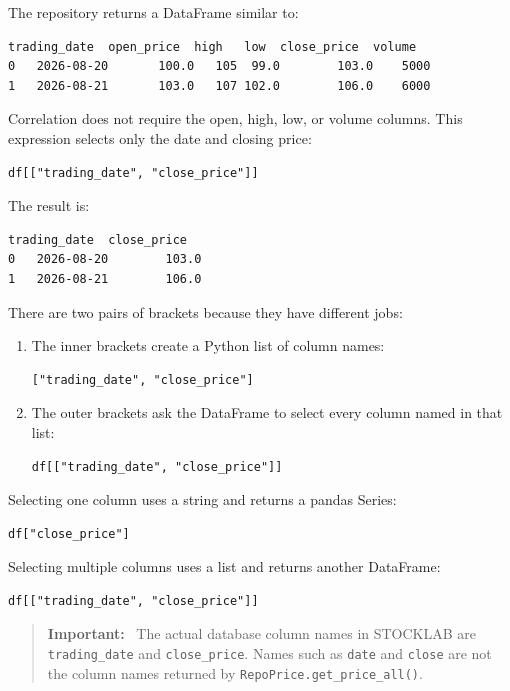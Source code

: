 \documentclass[11pt,a4paper]{article}
\newenvironment{important}
  {\begin{quote}\color{codered}\textbf{Important:}\ }
  {\end{quote}}
\begin{document}
The repository returns a DataFrame similar to:

\begin{lstlisting}[style=terminal]
  trading_date  open_price  high   low  close_price  volume
0   2026-08-20       100.0   105  99.0        103.0    5000
1   2026-08-21       103.0   107 102.0        106.0    6000
\end{lstlisting}

Correlation does not require the open, high, low, or volume columns. This
expression selects only the date and closing price:

\begin{lstlisting}[style=python]
df[["trading_date", "close_price"]]
\end{lstlisting}

The result is:

\begin{lstlisting}[style=terminal]
  trading_date  close_price
0   2026-08-20        103.0
1   2026-08-21        106.0
\end{lstlisting}

There are two pairs of brackets because they have different jobs:

\begin{enumerate}[leftmargin=2em]
    \item The inner brackets create a Python list of column names:
\begin{lstlisting}[style=python]
["trading_date", "close_price"]
\end{lstlisting}
    \item The outer brackets ask the DataFrame to select every column named in
    that list:
\begin{lstlisting}[style=python]
df[["trading_date", "close_price"]]
\end{lstlisting}
\end{enumerate}

Selecting one column uses a string and returns a pandas Series:

\begin{lstlisting}[style=python]
df["close_price"]
\end{lstlisting}

Selecting multiple columns uses a list and returns another DataFrame:

\begin{lstlisting}[style=python]
df[["trading_date", "close_price"]]
\end{lstlisting}

\begin{important}
The actual database column names in STOCKLAB are
\texttt{trading\_date} and \texttt{close\_price}. Names such as
\texttt{date} and \texttt{close} are not the column names returned by
\texttt{RepoPrice.get\_price\_all()}.
\end{important}
\end{document}
